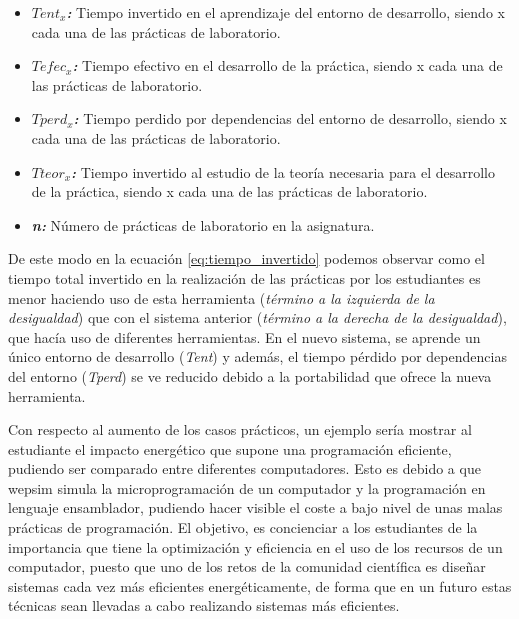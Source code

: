 \begin{itemize}

\item \textbf{\textit{$Tent_{x}$:}} Tiempo invertido en el aprendizaje del entorno de desarrollo, siendo x cada una de las prácticas de laboratorio.

\item \textbf{\textit{$Tefec_{x}$:}} Tiempo efectivo en el desarrollo de la práctica, siendo x cada una de las prácticas de laboratorio.

\item \textbf{\textit{$Tperd_{x}$:}} Tiempo perdido por dependencias del entorno de desarrollo, siendo x cada una de las prácticas de laboratorio.

\item \textbf{\textit{$Tteor_{x}$:}} Tiempo invertido al estudio de la teoría necesaria para el desarrollo de la práctica, siendo x cada una de las prácticas de laboratorio.

\item \textbf{\textit{n:}} Número de prácticas de laboratorio en la asignatura.

\end{itemize}

De este modo en la ecuación \ref{eq:tiempo_invertido} podemos observar como el tiempo total invertido en la realización de las prácticas por los estudiantes es menor haciendo uso de esta herramienta (\emph{término a la izquierda de la desigualdad}) que con el sistema anterior (\emph{término a la derecha de la desigualdad}), que hacía uso de diferentes herramientas. En el nuevo sistema, se aprende un único entorno de desarrollo (\emph{Tent}) y además, el tiempo pérdido por dependencias del entorno (\emph{Tperd}) se ve reducido debido a la portabilidad que ofrece la nueva herramienta.

Con respecto al aumento de los casos prácticos, un ejemplo sería mostrar al estudiante el impacto energético que supone una programación eficiente, pudiendo ser comparado entre diferentes computadores. Esto es debido a que \acrshort{wepsim} simula la microprogramación de un computador y la programación en lenguaje \gls{ensamblador}, pudiendo hacer visible el coste a bajo nivel de unas malas prácticas de programación. El objetivo, es concienciar a los estudiantes de la importancia que tiene la optimización y eficiencia en el uso de los recursos de un computador, puesto que uno de los retos de la comunidad científica es diseñar sistemas cada vez más eficientes energéticamente, de forma que en un futuro estas técnicas sean llevadas a cabo realizando sistemas más eficientes.

